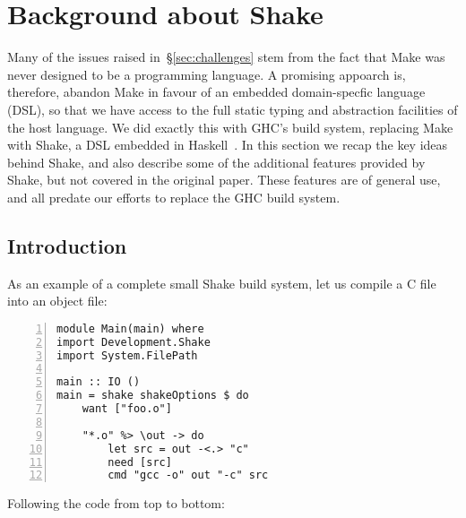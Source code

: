 \section{Background about Shake\label{sec:shake}}

Many of the issues raised in~\S\ref{sec:challenges} stem from the fact
that Make was never designed to be a programming language.  A
promising appoarch is, therefore, abandon Make in favour of an
embedded domain-specfic language (DSL), so that we have access to the full
static typing and abstraction facilities of the host language.
We did exactly this with GHC's build system, replacing Make with
Shake, a DSL embedded in Haskell~\cite{shake}. In this section we
recap the key ideas behind Shake, and also describe some of the additional
features provided by Shake, but not covered in the original paper. These
features are of general use, and all predate our efforts to replace the GHC build
system.

\subsection{Introduction\label{sec:shake_intro}}

As an example of a complete
small Shake build system, let us compile a C file into an object file:

\begin{lstlisting}[numbers=left,xleftmargin=2em,framexleftmargin=1.5em]
module Main(main) where
import Development.Shake
import System.FilePath

main :: IO ()
main = shake shakeOptions $ do
    want ["foo.o"]

    "*.o" %> \out -> do
        let src = out -<.> "c"
        need [src]
        cmd "gcc -o" out "-c" src
\end{lstlisting}

\noindent Following the code from top to bottom:

